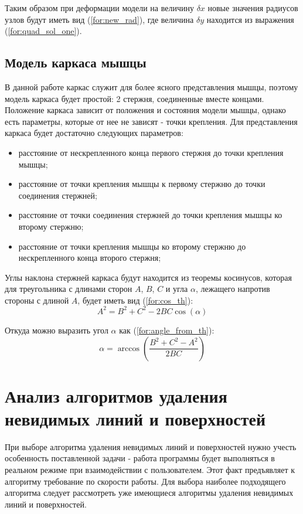 Таким образом при деформации модели на величину $\delta x$ новые значения радиусов узлов будут иметь вид (\ref{for:new_rad}), где величина $\delta y$ находится из выражения (\ref{for:quad_sol_one}).

\subsection{Модель каркаса мышцы}

В данной работе каркас служит для более ясного представления мышцы, поэтому модель каркаса будет простой: 2 стержня, соединенные вместе концами. Положение каркаса зависит от положения и состояния модели мышцы, однако есть параметры, которые от нее не зависят - точки крепления. Для представления каркаса будет достаточно следующих параметров:
\begin{itemize}
    \item расстояние от нескрепленного конца первого стержня до точки крепления мышцы;
    \item расстояние от точки крепления мышцы к первому стержню до точки соединения стержней;
    \item расстояние от точки соединения стержней до точки крепления мышцы ко второму стержню;
    \item расстояние от точки крепления мышцы ко второму стержню до нескрепленного конца второго стержня;
\end{itemize}

Углы наклона стержней каркаса будут находится из теоремы косинусов, которая для треугольника с длинами сторон $A$, $B$, $C$ и угла $\alpha$, лежащего напротив стороны с длиной $A$, будет иметь вид (\ref{for:cos_th}):
\begin{equation}
    \label{for:cos_th}
    A^2 = B^2 + C^2 - 2BC \cos(\alpha)
\end{equation}

Откуда можно выразить угол $\alpha$ как (\ref{for:angle_from_th}):
\begin{equation}
    \label{for:angle_from_th}
    \alpha = \arccos{\left(\frac{B^2 + C^2 - A^2}{2BC}\right)}
\end{equation}

\section{Анализ алгоритмов удаления невидимых линий и поверхностей}

При выборе алгоритма удаления невидимых линий и поверхностей нужно учесть особенность поставленной задачи - работа программы будет выполняться в реальном режиме при взаимодействии с пользователем. Этот факт предъявляет к алгоритму требование по скорости работы. Для выбора наиболее подходящего алгоритма следует рассмотреть уже имеющиеся алгоритмы удаления невидимых линий и поверхностей.

